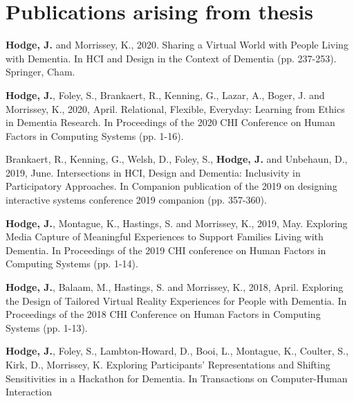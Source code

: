 \chapter{Publications arising from thesis}
\label{Publications}

\textbf{Hodge, J.} and Morrissey, K., 2020. Sharing a Virtual World with People Living with Dementia. In HCI and Design in the Context of Dementia (pp. 237-253). Springer, Cham.
\newline

\textbf{Hodge, J.}, Foley, S., Brankaert, R., Kenning, G., Lazar, A., Boger, J. and Morrissey, K., 2020, April. Relational, Flexible, Everyday: Learning from Ethics in Dementia Research. In Proceedings of the 2020 CHI Conference on Human Factors in Computing Systems (pp. 1-16).
\newline

Brankaert, R., Kenning, G., Welsh, D., Foley, S., \textbf{Hodge, J.} and Unbehaun, D., 2019, June. Intersections in HCI, Design and Dementia: Inclusivity in Participatory Approaches. In Companion publication of the 2019 on designing interactive systems conference 2019 companion (pp. 357-360).
\newline

\textbf{Hodge, J.}, Montague, K., Hastings, S. and Morrissey, K., 2019, May. Exploring Media Capture of Meaningful Experiences to Support Families Living with Dementia. In Proceedings of the 2019 CHI conference on Human Factors in Computing Systems (pp. 1-14).
\newline

\textbf{Hodge, J.}, Balaam, M., Hastings, S. and Morrissey, K., 2018, April. Exploring the Design of Tailored Virtual Reality Experiences for People with Dementia. In Proceedings of the 2018 CHI Conference on Human Factors in Computing Systems (pp. 1-13).
\newline

\textbf{Hodge, J.}, Foley, S., Lambton-Howard, D., Booi, L., Montague, K., Coulter, S., Kirk, D., Morrissey, K. Exploring Participants' Representations and Shifting Sensitivities in a Hackathon for Dementia. In Transactions on Computer-Human Interaction
\newline

